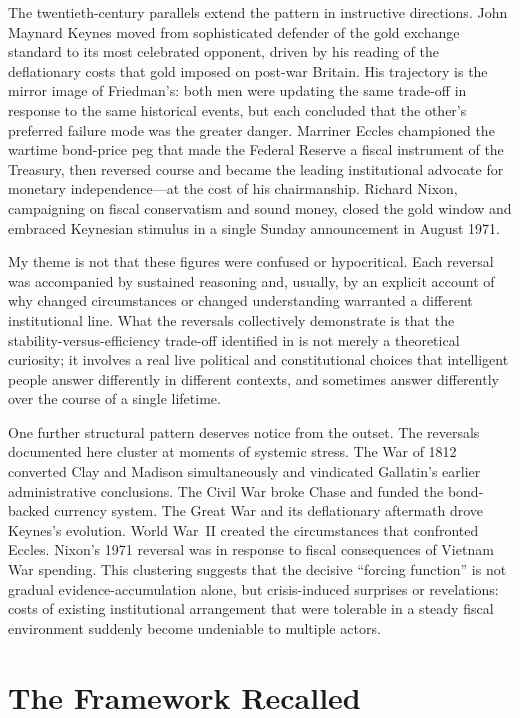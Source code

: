 \documentclass[12pt]{article}
\begin{document}
The twentieth-century parallels extend the pattern in instructive
directions.  John Maynard Keynes moved from sophisticated defender of
the gold exchange standard to its most celebrated opponent, driven by
his reading of the deflationary costs that gold imposed on post-war
Britain.  His trajectory is the mirror image of Friedman's: both men
were updating the same trade-off in response to the same historical
events, but each concluded that the other's preferred failure mode was
the greater danger.  Marriner Eccles championed the wartime bond-price
peg that made the Federal Reserve a fiscal instrument of the Treasury,
then reversed course and became the leading institutional advocate for
monetary independence---at the cost of his chairmanship.  Richard
Nixon, campaigning on fiscal conservatism and sound money, closed the
gold window and embraced Keynesian stimulus in a single Sunday
announcement in August 1971.

My theme is not that these figures were confused or hypocritical.
Each reversal was accompanied by sustained reasoning and, usually, by
an explicit account of why changed circumstances or changed understanding
warranted a different institutional line.  What the reversals collectively
demonstrate is that the stability-versus-efficiency trade-off identified
in \citet{Sargent2011} is not merely a theoretical curiosity; it involves a real  live political and constitutional choices that intelligent people
answer differently in different contexts, and sometimes answer differently
over the course of a single lifetime.

One further structural pattern deserves notice from the outset.  The
reversals documented here cluster at moments of systemic stress.  The
War of 1812 converted Clay and Madison simultaneously and vindicated
Gallatin's earlier administrative conclusions.  The Civil War broke
Chase and funded the bond-backed currency system.  The Great War and its
deflationary aftermath drove Keynes's evolution.  World War~II created
the circumstances that confronted  Eccles.  Nixon's 1971 reversal was in response to  fiscal consequences of Vietnam War spending.  This clustering
suggests that the decisive  ``forcing function'' is not gradual evidence-accumulation
alone, but crisis-induced surprises or revelations:  costs of existing
institutional arrangement that were tolerable in a steady fiscal
environment suddenly become undeniable to multiple actors.


\section{The Framework Recalled}
\end{document}
